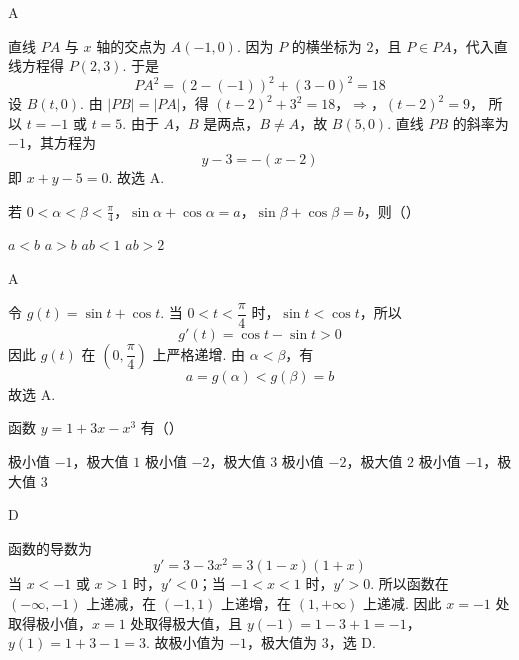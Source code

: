 \begin{answer}
A
\end{answer}

\begin{solution}
直线 \(PA\) 与 \(x\) 轴的交点为 \(A(-1,0)\). 因为 \(P\) 的横坐标为 \(2\)，且 \(P\in PA\)，代入直线方程得 \(P(2,3)\). 于是
\[
PA^2=(2-(-1))^2+(3-0)^2=18
\]
设 \(B(t,0)\). 由 \(\lvert PB\rvert=\lvert PA\rvert\)，得
\((t-2)^2+3^2=18\)，\(\Longrightarrow\)，\((t-2)^2=9\)，
所以 \(t=-1\) 或 \(t=5\). 由于 \(A\)，\(B\) 是两点，\(B\ne A\)，故 \(B(5,0)\). 直线 \(PB\) 的斜率为 \(-1\)，其方程为
\[
y-3=-(x-2)
\]
即 \(x+y-5=0\). 故选 A.
\end{solution}

\begin{problem}
若 \(0<\alpha<\beta<\frac{\pi}{4}\)，\(\sin\alpha+\cos\alpha=a\)，\(\sin\beta+\cos\beta=b\)，则（\quad）

\choices
    {\(a<b\)}
    {\(a>b\)}
    {\(ab<1\)}
    {\(ab>2\)}
\end{problem}

\begin{answer}
A
\end{answer}

\begin{solution}
令 \(g(t)=\sin t+\cos t\). 当 \(0<t<\dfrac\pi4\) 时，\(\sin t<\cos t\)，所以
\[
g'(t)=\cos t-\sin t>0
\]
因此 \(g(t)\) 在 \(\left(0,\dfrac\pi4\right)\) 上严格递增. 由 \(\alpha<\beta\)，有
\[
a=g(\alpha)<g(\beta)=b
\]
故选 A.
\end{solution}

\begin{problem}
函数 \(y=1+3x-x^3\) 有（\quad）

\choices
    {极小值 \(-1\)，极大值 \(1\)}
    {极小值 \(-2\)，极大值 \(3\)}
    {极小值 \(-2\)，极大值 \(2\)}
    {极小值 \(-1\)，极大值 \(3\)}
\end{problem}

\begin{answer}
D
\end{answer}

\begin{solution}
函数的导数为
\[
y'=3-3x^2=3(1-x)(1+x)
\]
当 \(x<-1\) 或 \(x>1\) 时，\(y'<0\)；当 \(-1<x<1\) 时，\(y'>0\). 所以函数在 \((-\infty,-1)\) 上递减，在 \((-1,1)\) 上递增，在 \((1,+\infty)\) 上递减. 因此 \(x=-1\) 处取得极小值，\(x=1\) 处取得极大值，且
\(y(-1)=1-3+1=-1\)，\(y(1)=1+3-1=3\).
故极小值为 \(-1\)，极大值为 \(3\)，选 D.
\end{solution}

